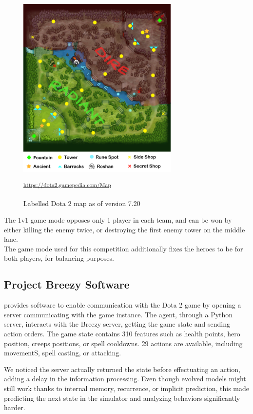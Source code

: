 \begin{figure}[H]
 \centering
 \captionsetup{justification=centering, margin=0.5cm}
 \includegraphics[width=8cm]{images/dota-map.png}
\caption{Labelled Dota 2 map as of version 7.20}
 \small\textsuperscript{\url{https://dota2.gamepedia.com/Map}}
 \label{fig:dota-2-map}
\end{figure}

The 1v1 game mode opposes only 1 player in each team, and can be won by either killing the enemy twice, or destroying the first enemy tower on the middle lane. \\
The game mode used for this competition additionally fixes the heroes to be  for both players, for balancing purposes.

\subsection{Project Breezy Software}
 provides software to enable communication with the Dota 2 game by opening a server communicating with the game instance. The agent, through a Python server, interacts with the Breezy server, getting the game state and sending action orders. The game state contains 310 features such as health points, hero position, creeps positions, or spell cooldowns. 29 actions are available, including movementS, spell casting, or attacking.

We noticed the server actually returned the state before effectuating an action, adding a delay in the information processing. Even though evolved models might still work thanks to internal memory, recurrence, or implicit prediction, this made predicting the next state in the simulator and analyzing behaviors significantly harder. 

